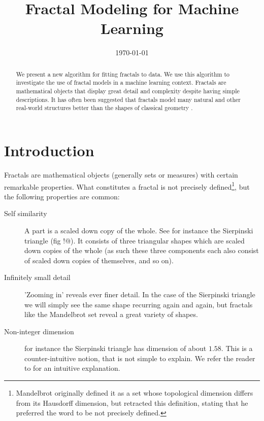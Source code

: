 \documentclass[10pt]{article}
\title{Fractal Modeling for Machine Learning}
\date{\today}
\theoremstyle{definition}
\begin{document}
\maketitle

\begin{abstract}
\noindent We present a new algorithm for fitting fractals to data. We use this algorithm to investigate the use of fractal models in a machine learning context. Fractals are mathematical objects that display great detail and complexity despite having simple descriptions. It has often been suggested that fractals model many natural and other real-world structures better than the shapes of classical geometry \cite{mandelbrot1982fractal}.
\end{abstract}


\section{Introduction}

Fractals are mathematical objects (generally sets or measures) with certain remarkable properties. What constitutes a fractal is not precisely defined\footnote{Mandelbrot originally defined it as a set whose topological dimension differs from its Hausdorff dimension, but retracted this definition, stating that he preferred the word to be not precisely defined.}, but the following properties are common:

\begin{description}
  \item[Self similarity] A part is a scaled down copy of the whole. See for instance the Sierpinski triangle (fig !@). It consists of three triangular shapes which are scaled down copies of the whole (as such these three components each also consist of scaled down copies of themselves, and so on).
  \item[Infinitely small detail] 'Zooming in' reveals ever finer detail. In the case of the Sierpinski triangle we will simply see the same shape recurring again and again, but fractals like the Mandelbrot set reveal a great variety of shapes.
  \item[Non-integer dimension] for instance the Sierpinski triangle has dimension of about $1.58$. This is a counter-intuitive notion, that is not simple to explain. We refer the reader to \cite{schroeder2009fractals} for an intuitive explanation.
\end{description}
\end{document}
